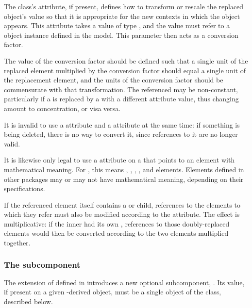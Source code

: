 The \ReplacedElement class's  attribute, if present, defines how to transform or rescale the replaced object's value so that it is appropriate for the new contexts in which the object appears.  This attribute takes a value of type , and the value must refer to a \Parameter object instance defined in the model.  This parameter then acts as a conversion factor.

The value of the conversion factor should be defined such that a single unit of the replaced element multiplied by the conversion factor should equal a single unit of the replacement element, and the units of the conversion factor should be commensurate with that transformation.  The referenced \Parameter may be non-constant, particularly if a \Species is replaced by a \Species with a different  attribute value, thus changing amount to concentration, or visa versa.

It is invalid to use a  attribute and a  attribute at the same time: if something is being deleted, there is no way to convert it, since references to it are no longer valid.

It is likewise only legal to use a  attribute on a \ReplacedElement that points to an element with mathematical meaning. For \sbmlthreecore, this means \Compartment, \Parameter, \Reaction, \Species, and \SpeciesReference elements.  Elements defined in other packages may or may not have mathematical meaning, depending on their specifications.

If the referenced element itself contains a \ReplacedElement or \ReplacedBy child, references to the elements to which they refer must also be modified according to the  attribute.  The effect is multiplicative: if the inner \ReplacedElement had its own , references to those doubly-replaced elements would then be converted according to the two  elements multiplied together.

\subsubsection{The \fixttspace{} subcomponent}

The extension of \SBase defined in  introduces a new optional subcomponent, .  Its value, if present on a given \SBase-derived object, must be a single object of the \ReplacedBy class, described below.


